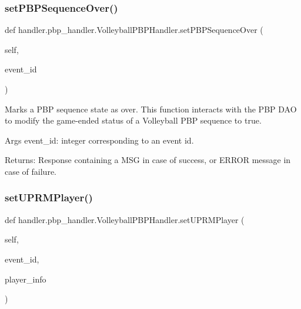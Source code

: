 \subsubsection{\texorpdfstring{set\+P\+B\+P\+Sequence\+Over()}{setPBPSequenceOver()}}
{\footnotesize\ttfamily def handler.\+pbp\+\_\+handler.\+Volleyball\+P\+B\+P\+Handler.\+set\+P\+B\+P\+Sequence\+Over (\begin{DoxyParamCaption}\item[{}]{self,  }\item[{}]{event\+\_\+id }\end{DoxyParamCaption})}

\begin{DoxyVerb}Marks a PBP sequence state as over.
This function interacts with the PBP DAO to modify the game-ended status of a Volleyball
PBP sequence to true.

Args
    event_id: integer corresponding to an event id.

Returns:
    Response containing a MSG in case of success, or ERROR message in case of failure.
\end{DoxyVerb}
 \mbox{\label{classhandler_1_1pbp__handler_1_1_volleyball_p_b_p_handler_aa7e3f8cd0284a25bcc7aca460f280a67}} 
\subsubsection{\texorpdfstring{set\+U\+P\+R\+M\+Player()}{setUPRMPlayer()}}
{\footnotesize\ttfamily def handler.\+pbp\+\_\+handler.\+Volleyball\+P\+B\+P\+Handler.\+set\+U\+P\+R\+M\+Player (\begin{DoxyParamCaption}\item[{}]{self,  }\item[{}]{event\+\_\+id,  }\item[{}]{player\+\_\+info }\end{DoxyParamCaption})}

